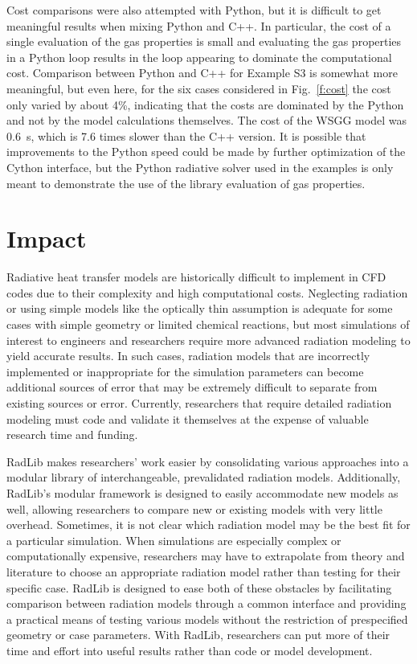 \documentclass[preprint,12pt, a4paper]{elsarticle}
\begin{document}
Cost comparisons were also attempted with Python, but it is difficult to get meaningful results when mixing Python and C++. In particular, the cost of a single evaluation of the gas properties is small and evaluating the gas properties in a Python loop results in the loop appearing to dominate the computational cost. Comparison between Python and C++ for Example S3 is somewhat more meaningful, but even here, for the six cases considered in Fig.~\ref{f:cost} the cost only varied by about 4\%, indicating that the costs are dominated by the Python and not by the model calculations themselves. The cost of the WSGG model was 0.6~s, which is 7.6 times slower than the C++ version. It is possible that improvements to the Python speed could be made by further optimization of the Cython interface, but the Python radiative solver used in the examples is only meant to demonstrate the use of the library evaluation of gas properties.


\section{Impact} \label{s:impact}

Radiative heat transfer models are historically difficult to implement in CFD codes due to their complexity and high computational costs. Neglecting radiation or using simple models like the optically thin assumption is adequate for some cases with simple geometry or limited chemical reactions, but most simulations of interest to engineers and researchers require more advanced radiation modeling to yield accurate results. In such cases, radiation models that are incorrectly implemented or inappropriate for the simulation parameters can become additional sources of error that may be extremely difficult to separate from existing sources or error. Currently, researchers that require detailed radiation modeling must code and validate it themselves at the expense of valuable research time and funding. 

RadLib makes researchers' work easier by consolidating various approaches into a modular library of interchangeable, prevalidated radiation models. Additionally, RadLib's modular framework is designed to easily accommodate new models as well, allowing researchers to compare new or existing models with very little overhead. Sometimes, it is not clear which radiation model may be the best fit for a particular simulation. When simulations are especially complex or computationally expensive, researchers may have to extrapolate from theory and literature to choose an appropriate radiation model rather than testing for their specific case. RadLib is designed to ease both of these obstacles by facilitating comparison between radiation models through a common interface and providing a practical means of testing various models without the restriction of prespecified geometry or case parameters. With RadLib, researchers can put more of their time and effort into useful results rather than code or model development. 
\end{document}
